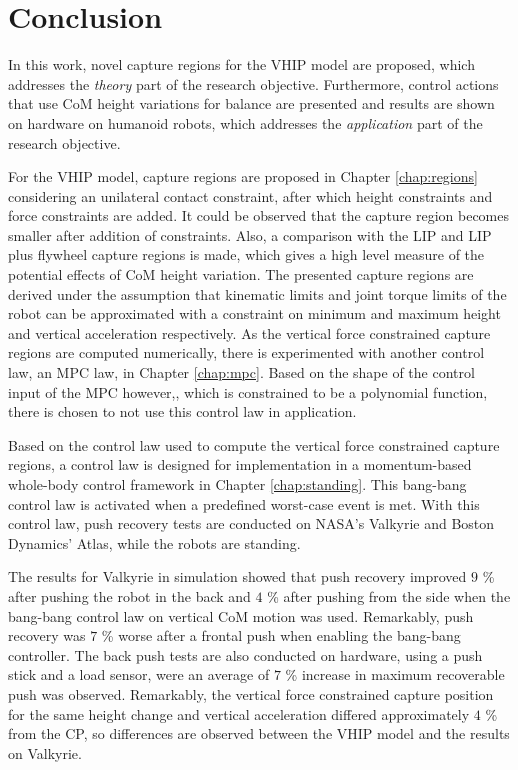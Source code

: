 %
\chapter{Conclusion}\label{chap:conclusion}
In this work, novel capture regions for the \ac{VHIP} model are proposed, which addresses the \textit{theory} part of the research objective. Furthermore, control actions that use \ac{CoM} height variations for balance are presented and results are shown on hardware on humanoid robots, which addresses the \textit{application} part of the research objective. 

For the \ac{VHIP} model, capture regions are proposed in Chapter \ref{chap:regions} considering an unilateral contact constraint, after which height constraints and force constraints are added. It could be observed that the capture region becomes smaller after addition of constraints. Also, a comparison with the \ac{LIP} and \ac{LIP} plus flywheel capture regions is made, which gives a high level measure of the potential effects of \ac{CoM} height variation. The presented capture regions are derived under the assumption that kinematic limits and joint torque limits of the robot can be approximated with a constraint on minimum and maximum height and vertical acceleration respectively. As the vertical force constrained capture regions are computed numerically, there is experimented with another control law, an \ac{MPC} law, in Chapter \ref{chap:mpc}. Based on the shape of the control input of the \ac{MPC} however,, which is constrained to be a polynomial function, there is chosen to not use this control law in application.

Based on the control law used to compute the vertical force constrained capture regions, a control law is designed for implementation in a momentum-based whole-body control framework in Chapter \ref{chap:standing}. This bang-bang control law is activated when a predefined worst-case event is met. With this control law, push recovery tests are conducted on NASA's Valkyrie and Boston Dynamics' Atlas, while the robots are standing. 

The results for Valkyrie in simulation showed that push recovery improved $9$ \% after pushing the robot in the back and $4$ \% after pushing from the side when the bang-bang control law on vertical \ac{CoM} motion was used. Remarkably, push recovery was $7$ \% worse after a frontal push when enabling the bang-bang controller. The back push tests are also conducted on hardware, using a push stick and a load sensor, were an average of $7$ \% increase in maximum recoverable push was observed. Remarkably, the vertical force constrained capture position for the same height change and vertical acceleration differed approximately $4$ \% from the \ac{CP}, so differences are observed between the \ac{VHIP} model and the results on Valkyrie.

